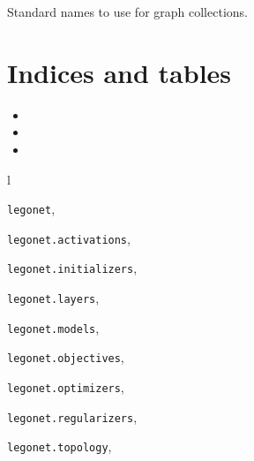 \documentclass[letterpaper,10pt,english]{sphinxmanual}
\begin{document}
\begin{fulllineitems}
\label{legonet:legonet.GraphKeys}
Standard names to use for graph collections.

\begin{fulllineitems}
\label{legonet:legonet.GraphKeys.MODEL_INPUTS}
\end{fulllineitems}


\end{fulllineitems}



\chapter{Indices and tables}
\label{index:indices-and-tables}\begin{itemize}
\item {} 

\item {} 

\item {} 

\end{itemize}


\renewcommand{\indexname}{Python Module Index}
\begin{theindex}
\def\bigletter#1{{\Large\sffamily#1}\nopagebreak\vspace{1mm}}
\bigletter{l}
\item {\texttt{legonet}}, \pageref{legonet:module-legonet}
\item {\texttt{legonet.activations}}, \pageref{legonet:module-legonet.activations}
\item {\texttt{legonet.initializers}}, \pageref{legonet:module-legonet.initializers}
\item {\texttt{legonet.layers}}, \pageref{legonet:module-legonet.layers}
\item {\texttt{legonet.models}}, \pageref{legonet:module-legonet.models}
\item {\texttt{legonet.objectives}}, \pageref{legonet:module-legonet.objectives}
\item {\texttt{legonet.optimizers}}, \pageref{legonet:module-legonet.optimizers}
\item {\texttt{legonet.regularizers}}, \pageref{legonet:module-legonet.regularizers}
\item {\texttt{legonet.topology}}, \pageref{legonet:module-legonet.topology}
\end{theindex}

\renewcommand{\indexname}{Index}
\printindex
\end{document}
